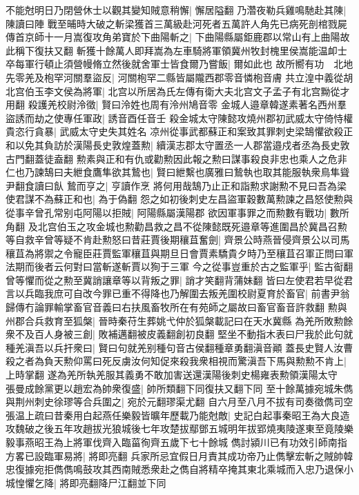 不能尅明日乃閉營休士以觀其變知賊意稍懈|{
	懈居隘翻}
乃濳夜勒兵雞鳴馳赴其陳|{
	陳讀曰陣}
戰至晡時大破之斬梁獲首三萬級赴河死者五萬許人角先已病死剖棺戮屍傳首京師十一月嵩復攻角弟寶於下曲陽斬之|{
	下曲陽縣屬鉅鹿郡以常山有上曲陽故此稱下復扶又翻}
斬獲十餘萬人即拜嵩為左車騎將軍領冀州牧封槐里侯嵩能温卹士卒每軍行頓止須營幔脩立然後就舍軍士皆食爾乃嘗飯|{
	爾如此也}
故所嚮有功　北地先零羌及枹罕河關羣盜反|{
	河關枹罕二縣皆屬隴西郡零音憐枹音膚}
共立湟中義從胡北宫伯玉李文侯為將軍|{
	北宫以所居為氏左傳有衛大夫北宫文子孟子有北宫黝從才用翻}
殺護羌校尉泠徵|{
	賢曰泠姓也周有泠州鳩音零}
金城人邉章韓遂素著名西州羣盜誘而劫之使專任軍政|{
	誘音酉任音壬}
殺金城太守陳懿攻燒州郡初武威太守倚恃權貴恣行貪暴|{
	武威太守史失其姓名}
凉州從事武都蘇正和案致其罪刺史梁鵠懼欲殺正和以免其負訪於漢陽長史敦煌蓋勲|{
	續漢志郡太守置丞一人郡當邉戍者丞為長史敦古門翻蓋徒盍翻}
勲素與正和有仇或勸勲因此報之勲曰謀事殺良非忠也乘人之危非仁也乃諫鵠曰夫紲食鷹隼欲其鷙也|{
	賢曰紲繫也廣雅曰鷙執也取其能服執衆鳥隼聳尹翻食讀曰飤}
鷙而亨之|{
	亨讀作烹}
將何用哉鵠乃止正和詣勲求謝勲不見曰吾為梁使君謀不為蘇正和也|{
	為于偽翻}
怨之如初後刺史左昌盜軍穀數萬勲諫之昌怒使勲與從事辛曾孔常别屯阿陽以拒賊|{
	阿陽縣屬漢陽郡}
欲因軍事罪之而勲數有戰功|{
	數所角翻}
及北宫伯玉之攻金城也勲勸昌救之昌不從陳懿既死邉章等進圍昌於冀昌召勲等自救辛曾等疑不肯赴勲怒曰昔莊賈後期穰苴奮劍|{
	齊景公時燕晉侵齊景公以司馬穰苴為將禦之令寵臣莊賈監軍穰苴與期旦日會賈素驕貴夕時乃至穰苴召軍正問曰軍法期而後者云何對曰當斬遂斬賈以狥于三軍}
今之從事豈重於古之監軍乎|{
	監古䘖翻}
曾等懼而從之勲至冀誚讓章等以背叛之罪|{
	誚才笑翻背蒲妹翻}
皆曰左使君若早從君言以兵臨我庶可自改今罪已重不得降也乃解圍去叛羌圍校尉夏育於畜官|{
	前書尹翁歸傳冇論罪輸掌畜官音義曰右扶風畜牧所在有苑師之屬故曰畜官畜音許救翻}
勲與州郡合兵救育至狐槃|{
	晉時秦苻生葬姚弋仲於狐槃載記曰在天水冀縣}
為羌所敗勲餘衆不及百人身被三創|{
	敗補邁翻被皮義翻創初良翻}
堅坐不動指木表曰尸我於此句就種羌滇吾以兵扞衆曰|{
	賢曰句就羌别種句音古侯翻種章勇翻滇音顚}
蓋長史賢人汝曹殺之者為負天勲仰罵曰死反虜汝何知促來殺我衆相視而驚滇吾下馬與勲勲不肯上|{
	上時掌翻}
遂為羌所執羌服其義勇不敢加害送還漢陽後刺史楊雍表勲領漢陽太守　張曼成餘黨更以趙宏為帥衆復盛|{
	帥所類翻下同復扶又翻下同}
至十餘萬據宛城朱儁與荆州刺史徐璆等合兵圍之|{
	宛於元翻璆渠尤翻}
自六月至八月不拔有司奏徵儁司空張温上疏曰昔秦用白起燕任樂毅皆曠年歷載乃能尅敵|{
	史記白起事秦昭王為大良造攻魏破之後五年攻趙拔光狼城後七年攻楚拔鄢鄧五城明年拔郢燒夷陵遂東至竟陵樂毅事燕昭王為上將軍伐齊入臨菑徇齊五歲下七十餘城}
儁討潁川已有功效引師南指方畧已設臨軍易將|{
	將即亮翻}
兵家所忌宜假日月責其成功帝乃止儁擊宏斬之賊帥韓忠復據宛拒儁儁鳴鼓攻其西南賊悉衆赴之儁自將精卒掩其東北乘城而入忠乃退保小城惶懼乞降|{
	將即亮翻降尸江翻並下同}
